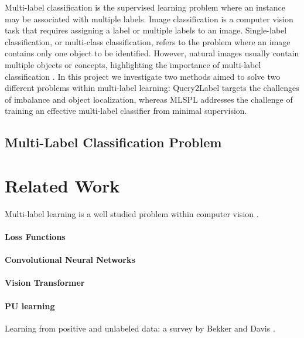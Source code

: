 \documentclass[lettersize,journal]{IEEEtran}
\begin{document}
Multi-label classification is the supervised learning problem where an instance may be associated with multiple labels. Image classification is a computer vision task that requires assigning a label or multiple labels to an image. Single-label classification, or multi-class classification, refers to the problem where an image contains only one object to be identified. However, natural images usually contain multiple objects or concepts, highlighting the importance of multi-label classification \cite{ridnik2021mldecoderscalableversatileclassification}. In this project we investigate two methods aimed to solve two different problems within multi-label learning: Query2Label targets the challenges of imbalance and object localization, whereas MLSPL addresses the challenge of training an effective multi-label classifier from minimal supervision.

\subsection{Multi-Label Classification Problem}

\section{Related Work}
Multi-label learning is a well studied problem within computer vision \cite{mlsp}. 



\paragraph{Loss Functions}

\paragraph{Convolutional Neural Networks}

\paragraph{Vision Transformer}


\paragraph{PU learning} 
Learning from positive and unlabeled data: a survey by Bekker and Davis \cite{Bekker_2020}.
\end{document}
